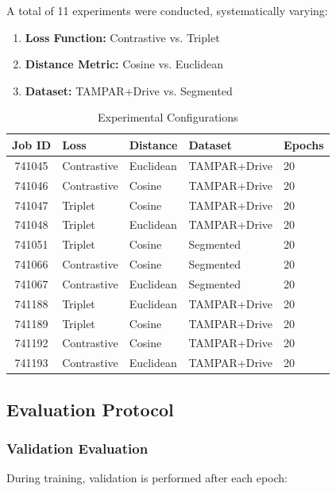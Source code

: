 \documentclass[12pt,a4paper]{article}
\begin{document}
A total of 11 experiments were conducted, systematically varying:

\begin{enumerate}
    \item \textbf{Loss Function:} Contrastive vs. Triplet
    \item \textbf{Distance Metric:} Cosine vs. Euclidean
    \item \textbf{Dataset:} TAMPAR+Drive vs. Segmented
\end{enumerate}

\begin{table}[H]
\centering
\caption{Experimental Configurations}
\label{tab:experiments}
\begin{tabular}{cllll}
\toprule
\textbf{Job ID} & \textbf{Loss} & \textbf{Distance} & \textbf{Dataset} & \textbf{Epochs} \\
\midrule
741045 & Contrastive & Euclidean & TAMPAR+Drive & 20 \\
741046 & Contrastive & Cosine & TAMPAR+Drive & 20 \\
741047 & Triplet & Cosine & TAMPAR+Drive & 20 \\
741048 & Triplet & Euclidean & TAMPAR+Drive & 20 \\
741051 & Triplet & Cosine & Segmented & 20 \\
741066 & Contrastive & Cosine & Segmented & 20 \\
741067 & Contrastive & Euclidean & Segmented & 20 \\
741188 & Triplet & Euclidean & TAMPAR+Drive & 20 \\
741189 & Triplet & Cosine & TAMPAR+Drive & 20 \\
741192 & Contrastive & Cosine & TAMPAR+Drive & 20 \\
741193 & Contrastive & Euclidean & TAMPAR+Drive & 20 \\
\bottomrule
\end{tabular}
\end{table}

\subsection{Evaluation Protocol}

\subsubsection{Validation Evaluation}

During training, validation is performed after each epoch:
\end{document}
